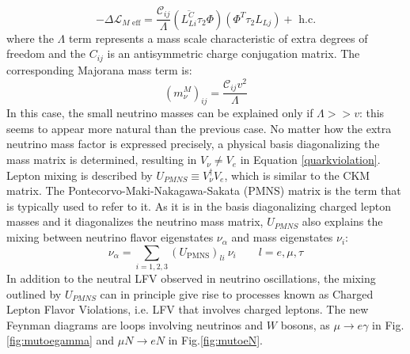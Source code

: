 \begin{equation}
-\Delta \mathscr{L}_{M \text { eff}}=\frac{\mathcal{C}_{i j}}{\Lambda}\left(\overline{L_{L i}^C} \tau_2 \Phi\right)\left(\Phi^T \tau_2 L_{L j}\right)+\text { h.c.}
\end{equation}
where the $\Lambda$ term represents a mass scale characteristic of extra degrees of freedom and the $C_{ij}$ is an antisymmetric charge conjugation matrix. The corresponding Majorana mass term is:
\begin{equation}
\left(m_\nu^M\right)_{i j}=\frac{\mathcal{C}_{i j} v^2}{\Lambda}
\end{equation}
In this case, the small neutrino masses can be explained only if $\Lambda > > v$: this seems to appear more natural than the previous case. No matter how the extra neutrino mass factor is expressed precisely, a physical basis diagonalizing the mass matrix is determined, resulting in $V_{\nu} \neq V_e$ in Equation \ref{quarkviolation}. Lepton mixing is described by $U_{PMNS} \equiv V_{\nu}^{\dagger} V_e$, which is similar to the CKM matrix. The Pontecorvo-Maki-Nakagawa-Sakata (PMNS) matrix is the term that is typically used to refer to it. As it is in the basis diagonalizing charged lepton masses and it diagonalizes the neutrino mass matrix, $U_{PMNS}$ also explains the mixing between neutrino flavor eigenstates $\nu_{\alpha}$ and mass eigenstates $\nu_i$:
\begin{equation}
\nu_\alpha=\sum_{i=1,2,3}\left(U_{\mathrm{PMNS}}\right)_{l i} \ \nu_i \qquad l=e, \mu, \tau
\end{equation}
In addition to the neutral LFV observed in neutrino oscillations, the mixing outlined by $U_{PMNS}$ can in principle give rise to processes known as Charged Lepton Flavor Violations, i.e. LFV that involves charged leptons. The new Feynman diagrams are loops involving neutrinos and $W$ bosons, as $\mu \rightarrow e \gamma$ in Fig.\ref{fig:mutoegamma} and $\mu N \rightarrow e N$ in Fig.\ref{fig:mutoeN}. 




